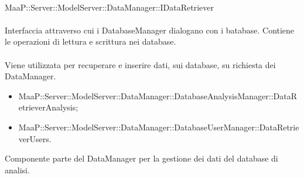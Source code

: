 	\\
	MaaP::Server::ModelServer::DataManager::IDataRetriever\\
	\\
	Interfaccia attraverso cui i DatabaseManager dialogano con i batabase. Contiene le operazioni di lettura e scrittura nei database.\\
	\\
	Viene utilizzata per recuperare e inserire dati, sui database, su richiesta dei DataManager.\\
	\begin{itemize}
	\item MaaP::Server::ModelServer::DataManager::DatabaseAnalysisManager::DataRetrieverAnalysis;
	\item MaaP::Server::ModelServer::DataManager::DatabaseUserManager::DataRetrieverUsers.	
	\end{itemize}

Componente parte del DataManager per la gestione dei dati del database di analisi.

